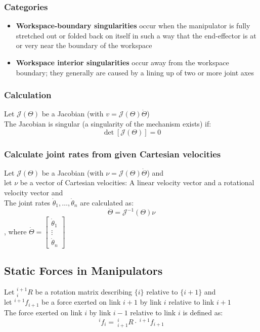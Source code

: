 \documentclass[10pt,a4paper]{article}
\newcommand{\vect}[1]{\ensuremath{\begin{bmatrix}#1\end{bmatrix}}}
\begin{document}
\subsubsection{Categories}
\begin{itemize}
	\item \textbf{Workspace-boundary singularities} occur when the manipulator is fully stretched out or folded back on itself in such a way that the end-effector is at or very near the boundary of the workspace
	\item \textbf{Workspace interior singularities} occur away from the workspace boundary; they generally are caused by a lining up of two or more joint axes
\end{itemize}

\subsubsection{Calculation}
Let $\mathcal{J}(\Theta)$ be a Jacobian (with $v  = \mathcal{J}(\Theta)\dot \Theta$)\\
The Jacobian is singular (a singularity of the mechanism exists) if: \\
$$
	\det[\mathcal{J}(\Theta)] = 0
$$

\subsubsection{Calculate joint rates from given Cartesian velocities}
Let $\mathcal{J}(\Theta)$ be a Jacobian (with $\nu  = \mathcal{J}(\Theta)\dot \Theta$) and \\
let $\nu$ be a vector of Cartesian velocities: A linear velocity vector and a rotational velocity vector and \\
The joint rates $\dot \theta_1, \dots, \dot \theta_n$ are calculated as:
$$
	\dot{\Theta} = \mathcal{J}^{-1}(\Theta)\nu
$$
, where $\dot{\Theta} = \vect{\dot{\theta}_1 \\ \vdots \\ \dot{\theta}_n}$

\subsection{Static Forces in Manipulators}
Let $^{i+1}_iR$ be a rotation matrix describing $\{i\}$ relative to $\{i+1\}$ and\\
let $^{i+1}f_{i+1}$ be a force exerted on link $i+1$ by link $i$ relative to link $i+1$ \\
The force exerted on link $i$ by link $i-1$ relative to link $i$ is defined as:
$$
	^if_i = ~^i_{i+1}R ⋅ ~^{i+1}f_{i+1}
$$ \\
\end{document}
